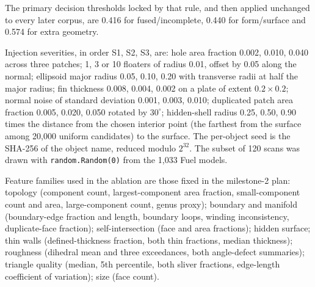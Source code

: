 The primary decision thresholds locked by that rule, and then applied unchanged to every later corpus, are 0.416 for fused/incomplete, 0.440 for form/surface and 0.574 for extra geometry.

Injection severities, in order S1, S2, S3, are: hole area fraction 0.002, 0.010, 0.040 across three patches; 1, 3 or 10 floaters of radius 0.01, offset by 0.05 along the normal; ellipsoid major radius 0.05, 0.10, 0.20 with transverse radii at half the major radius; fin thickness 0.008, 0.004, 0.002 on a plate of extent \(0.2 \times 0.2\); normal noise of standard deviation 0.001, 0.003, 0.010; duplicated patch area fraction 0.005, 0.020, 0.050 rotated by \(30^\circ\); hidden-shell radius 0.25, 0.50, 0.90 times the distance from the chosen interior point (the farthest from the surface among 20{,}000 uniform candidates) to the surface.
The per-object seed is the SHA-256 of the object name, reduced modulo \(2^{32}\).
The subset of 120 scans was drawn with \texttt{random.Random(0)} from the 1{,}033 Fuel models.

Feature families used in the ablation are those fixed in the milestone-2 plan: topology (component count, largest-component area fraction, small-component count and area, large-component count, genus proxy); boundary and manifold (boundary-edge fraction and length, boundary loops, winding inconsistency, duplicate-face fraction); self-intersection (face and area fractions); hidden surface; thin walls (defined-thickness fraction, both thin fractions, median thickness); roughness (dihedral mean and three exceedances, both angle-defect summaries); triangle quality (median, 5th percentile, both sliver fractions, edge-length coefficient of variation); size (face count).
